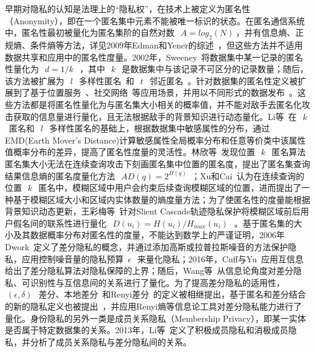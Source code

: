 早期对隐私的认知是法理上的“隐私权”，在技术上被定义为匿名性（Anonymity），即在一个匿名集中元素不能被唯一标识的状态。在匿名通信系统中，匿名性最初被量化为匿名集阶的自然对数~$~A=log_2(N)~$\cite{reiter1998crowds}，并有信息熵、正规熵、条件熵等方法，详见2009年Edman和Yener的综述~\cite{edman2009anonymity}，但这些方法并不适用数据共享和应用中的匿名性度量。2002年，Sweeney~\cite{sweeney2002k}将数据集中某一记录的匿名性量化为~$~d=1/k~$~，其中~$~k~$~是数据集中与该记录不可区分的记录数量；随后，该方法被扩展为~$~l~$~多样性匿名~\cite{machanavajjhala2007l}和~$~t~$~邻近匿名~\cite{li2007t}。针对数据集的匿名性定义被扩展到了基于位置服务~\cite{niu2014achieving}、社交网络~\cite{campan2008data}等应用场景，并用以不同形式的数据发布~\cite{wong2006anonymity,ying2009comparisons}。这些方法都是将匿名性量化为与匿名集大小相关的概率值，并不能对敌手去匿名化攻击获取的信息量进行量化，且无法根据敌手的背景知识进行动态量化。Li等~\cite{li2010closeness}在~$~k~$~匿名和~$~l~$~多样性匿名的基础上，根据数据集中敏感属性的分布，通过EMD(Earth Mover's Distance)计算敏感属性全局概率分布和任意等价类中该属性值概率分布的差异，提高了匿名性度量的灵活性。林欣等~\cite{lin2009lbs}发现位置~$~k~$~匿名算法匿名集大小无法在连续查询攻击下刻画匿名集中位置的匿名度，提出了匿名集查询结果信息熵的匿名度量化方法~$~AD(q)=2^{H(q)}$~；Xu和Cai~\cite{xu2007location}认为在连续查询的位置~$~k~$~匿名中，模糊区域中用户会约束后续查询模糊区域的位置，进而提出了一种基于模糊区域大小和区域内实体数量的熵度量方法；为了使匿名性的度量能根据背景知识动态更新，王彩梅等~\cite{wang2012location}针对Slient Cascade轨迹隐私保护将模糊区域前后用户假名间的联系性进行量化~$~D(u_i)=H(u_i)/H_{max}(u_i)~$~。基于匿名集的大小及其数据概率分布对匿名性的度量，不能达到数学上的严谨证明，2006年Dwork~\cite{dwork2006differential}定义了差分隐私的概念，并通过添加高斯或拉普拉斯噪音的方法保护隐私，应用控制噪音量的隐私预算~$\epsilon~$~来量化隐私；2016年，Cuff与Yu~\cite{cuff2016differential}应用互信息给出了差分隐私算法对隐私保障的上界；随后，Wang等~\cite{wang2016relation}从信息论角度对差分隐私、可识别性与互信息间的关系进行了量化。为了提高差分隐私的适用性，~$~(\epsilon,\delta)~$~差分、本地差分~\cite{kairouz2014extremal}和Renyi差分~\cite{mironov2017renyi}的定义被相继提出，基于匿名和差分结合的新的隐私定义也被提出~\cite{holohan2017k}，并应用Renyi熵等信息论工具对差分隐私能力进行了量化。身份隐私的另外一类是成员关系隐私（Membership Privacy），即某一实体是否属于特定数据集的关系。2013年，Li等~\cite{li2013membership}定义了积极成员隐私和消极成员隐私，并分析了成员关系隐私与差分隐私间的关系。

